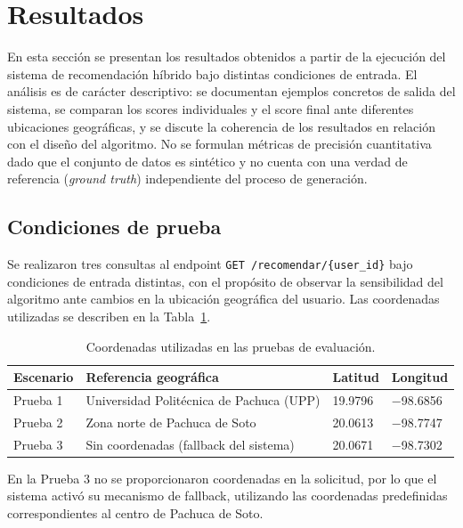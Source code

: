 \documentclass[11pt, letterpaper]{article}
\begin{document}
	\section{Resultados}
	
	En esta sección se presentan los resultados obtenidos a partir de la
	ejecución del sistema de recomendación híbrido bajo distintas condiciones
	de entrada. El análisis es de carácter descriptivo: se documentan ejemplos
	concretos de salida del sistema, se comparan los scores individuales y el
	score final ante diferentes ubicaciones geográficas, y se discute la
	coherencia de los resultados en relación con el diseño del algoritmo.
	No se formulan métricas de precisión cuantitativa dado que el conjunto
	de datos es sintético y no cuenta con una verdad de referencia
	(\textit{ground truth}) independiente del proceso de generación.
	
	\subsection{Condiciones de prueba}
	
	Se realizaron tres consultas al endpoint
	\texttt{GET /recomendar/\{user\_id\}} bajo condiciones de entrada distintas,
	con el propósito de observar la sensibilidad del algoritmo ante cambios
	en la ubicación geográfica del usuario. Las coordenadas utilizadas se
	describen en la Tabla~\ref{tab:coordenadas_prueba}.
	
	\begin{table}[H]
		\centering
		\caption{Coordenadas utilizadas en las pruebas de evaluación.}
		\label{tab:coordenadas_prueba}
		\begin{tabular}{llll}
			\hline
			\textbf{Escenario} & \textbf{Referencia geográfica} & \textbf{Latitud} & \textbf{Longitud} \\
			\hline
			Prueba 1 & Universidad Politécnica de Pachuca (UPP) & 19.9796 & $-$98.6856 \\
			Prueba 2 & Zona norte de Pachuca de Soto            & 20.0613 & $-$98.7747 \\
			Prueba 3 & Sin coordenadas (fallback del sistema)   & 20.0671 & $-$98.7302 \\
			\hline
		\end{tabular}
	\end{table}
	
	En la Prueba 3 no se proporcionaron coordenadas en la solicitud, por lo que
	el sistema activó su mecanismo de fallback, utilizando las coordenadas
	predefinidas correspondientes al centro de Pachuca de Soto.
	
\end{document}
